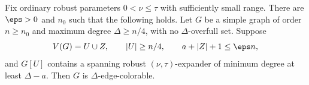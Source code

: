 \begin{lemma}\label{single:lem:coloring}
Fix ordinary robust parameters $0<\nu\le\tau$ with sufficiently
small range. There are $\eps>0$ and $n_0$ such that the following
holds. Let $G$ be a simple graph of order $n\ge n_0$ and maximum
degree $\Delta\ge n/4$, with no $\Delta$-overfull set. Suppose
\[
 V(G)=U\cup Z,\qquad |U|\ge n/4,\qquad
 a+|Z|+1\le\eps n,
\]
and $G[U]$ contains a spanning robust $(\nu,\tau)$-expander
of minimum degree at least $\Delta-a$. Then $G$ is $\Delta$-edge-colorable.
\end{lemma}